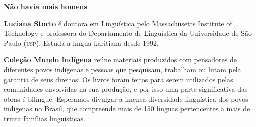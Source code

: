 \textbf{Não havia mais homens} 

\textbf{Luciana Storto} é doutora em Linguística pelo Massachusetts Institute of
Technology e professora do Departamento de Linguística da Universidade
de São Paulo (\textsc{usp}). Estuda a língua karitiana desde 1992.



\textbf{Coleção Mundo Indígena} reúne materiais produzidos com pensadores de diferentes povos indígenas e pessoas que pesquisam, trabalham ou lutam pela garantia de seus direitos. Os livros foram feitos para serem utilizados pelas comunidades envolvidas na sua produção, e por isso uma parte significativa das obras é bilíngue. Esperamos divulgar a imensa diversidade linguística dos povos indígenas no Brasil, que compreende mais de 150 línguas pertencentes a mais de trinta famílias linguísticas.

